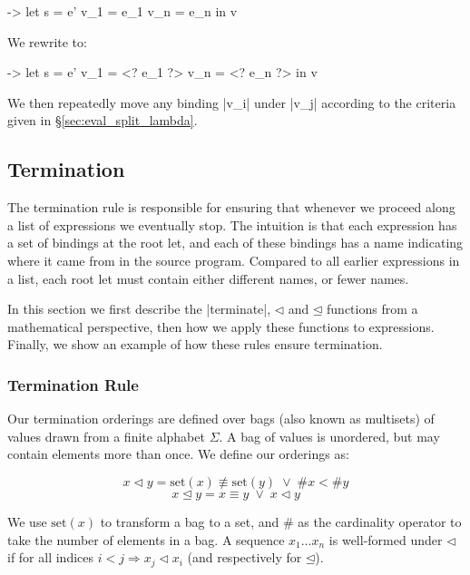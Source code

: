 \documentclass[draft]{sigplanconf}
\newcommand{\set}{\mathrm{set}}
\newcommand{\veeskip}{\;\vee\;}
\begin{document}
\begin{code}
\free ->  let  s    = e'
               v_1  = e_1
               v_n  = e_n
          in   v
\end{code}

\noindent We rewrite to:

\begin{code}
\free ->  let  s    = e'
               v_1  = <? e_1 ?>
               v_n  = <? e_n ?>
          in   v
\end{code}

We then repeatedly move any binding |v_i| under |v_j| according to the criteria given in \S\ref{sec:eval_split_lambda}.

\subsection{Termination}
\label{sec:term}

The termination rule is responsible for ensuring that whenever we proceed along a list of expressions we eventually stop. The intuition is that each expression has a set of bindings at the root let, and each of these bindings has a name indicating where it came from in the source program. Compared to all earlier expressions in a list, each root let must contain either different names, or fewer names.

In this section we first describe the |terminate|, $\lhd$ and $\unlhd$ functions from a mathematical perspective, then how we apply these functions to expressions. Finally, we show an example of how these rules ensure termination.

\subsubsection{Termination Rule}
\label{sec:term_rule}

Our termination orderings are defined over bags (also known as multisets) of values drawn from a finite alphabet $\Sigma$. A bag of values is unordered, but may contain elements more than once. We define our orderings as:

\vspace{-\bigskipamount}

\[
x \lhd y = \set(x) \not\equiv \set(y)  \veeskip \# x < \# y
\]
\[
x \unlhd y = x \equiv y \veeskip x \lhd y
\]

We use $\set(x)$ to transform a bag to a set, and $\#$ as the cardinality operator to take the number of elements in a bag. A sequence $x_1 \ldots x_n$ is well-formed under $\lhd$ if for all indices $i < j \Rightarrow x_j \lhd x_i$ (and respectively for $\unlhd$).
\end{document}
